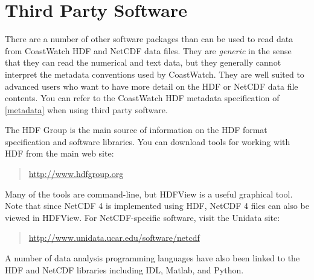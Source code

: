 \section{Third Party Software}
\label{third}

There are a number of other software packages than can
be used to read data from CoastWatch HDF and NetCDF data files.  They are {\em
generic} in the sense that they can read the numerical and text data,
but they generally cannot interpret the metadata conventions used by CoastWatch.
They are well suited to advanced users who want to have more detail on
the HDF or NetCDF data file contents.  You can refer to the CoastWatch
HDF metadata specification of \autoref{metadata} when using third
party software.

The HDF Group is the main source of information
on the HDF format specification and software libraries.  You can
download tools for working with HDF from the main web site:
\begin{quote}
  \url{http://www.hdfgroup.org}
\end{quote} 
Many of the tools are command-line, but HDFView is a useful graphical
tool.  Note that since NetCDF 4 is implemented using HDF, NetCDF 4 files can
also be viewed in HDFView.  For NetCDF-specific software, visit the Unidata site:
\begin{quote}
  \url{http://www.unidata.ucar.edu/software/netcdf}
\end{quote}

A number of data analysis programming languages have also been linked to the
HDF and NetCDF libraries including IDL, Matlab, and Python.

